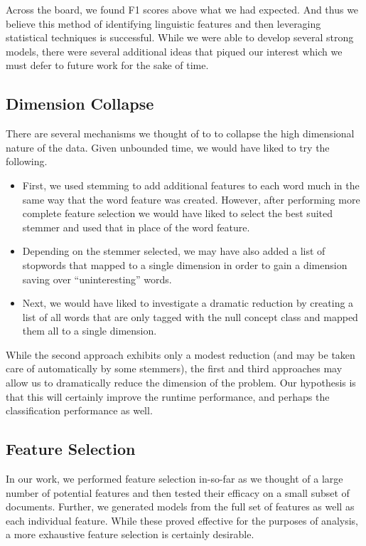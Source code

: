 \documentclass[preprint]{style}
\begin{document}
Across the board, we found F1 scores above what we had expected. And thus we believe this method of identifying linguistic features and then leveraging statistical techniques is successful. While we were able to develop several strong models, there were several additional ideas that piqued our interest which we must defer to future work for the sake of time.

\subsection{Dimension Collapse}
There are several mechanisms we thought of to to collapse the high dimensional nature of the data. Given unbounded time, we would have liked to try the following.

\begin{itemize}
\item First, we used stemming to add additional features to each word much in the same way that the word feature was created. However, after performing more complete feature selection we would have liked to select the best suited stemmer and used that in place of the word feature.

\item Depending on the stemmer selected, we may have also added a list of stopwords that mapped to a single dimension in order to gain a dimension saving over ``uninteresting'' words.

\item Next, we would have liked to investigate a dramatic reduction by creating a list of all words that are only tagged with the null concept class and mapped them all to a single dimension.
\end{itemize}

While the second approach exhibits only a modest reduction (and may be taken care of automatically by some stemmers), the first and third approaches may allow us to dramatically reduce the dimension of the problem. Our hypothesis is that this will certainly improve the runtime performance, and perhaps the classification performance as well.

\subsection{Feature Selection}
In our work, we performed feature selection in-so-far as we thought of a large number of potential features and then tested their efficacy on a small subset of documents. Further, we generated models from the full set of features as well as each individual feature. While these proved effective for the purposes of analysis, a more exhaustive feature selection is certainly desirable. 
\end{document}
